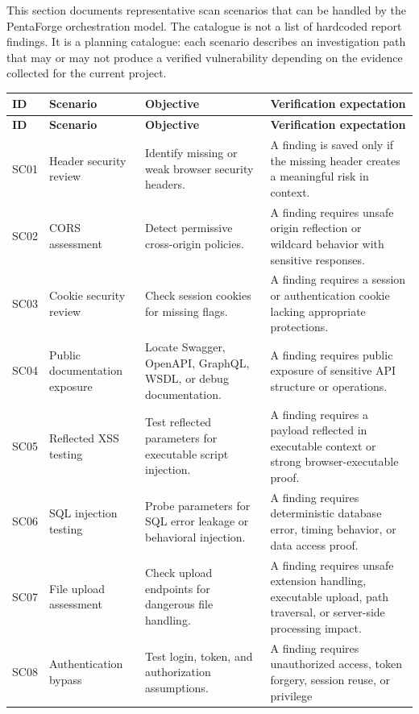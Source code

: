 \documentclass[12pt,a4paper]{report}
\begin{document}
This section documents representative scan scenarios that can be handled by the
PentaForge orchestration model. The catalogue is not a list of hardcoded report
findings. It is a planning catalogue: each scenario describes an investigation path
that may or may not produce a verified vulnerability depending on the evidence collected
for the current project.

\begin{longtable}{|p{}|p{}|p{}|p{}|}
\hline
\textbf{ID} & \textbf{Scenario} & \textbf{Objective} & \textbf{Verification expectation} \\
\hline
\endfirsthead
\hline
\textbf{ID} & \textbf{Scenario} & \textbf{Objective} & \textbf{Verification expectation} \\
\hline
\endhead
SC01 & Header security review & Identify missing or weak browser security headers. &
A finding is saved only if the missing header creates a meaningful risk in context. \\
\hline
SC02 & CORS assessment & Detect permissive cross-origin policies. & A finding requires
unsafe origin reflection or wildcard behavior with sensitive responses. \\
\hline
SC03 & Cookie security review & Check session cookies for missing flags. & A finding
requires a session or authentication cookie lacking appropriate protections. \\
\hline
SC04 & Public documentation exposure & Locate Swagger, OpenAPI, GraphQL, WSDL, or
debug documentation. & A finding requires public exposure of sensitive API structure
or operations. \\
\hline
SC05 & Reflected XSS testing & Test reflected parameters for executable script
injection. & A finding requires a payload reflected in executable context or strong
browser-executable proof. \\
\hline
SC06 & SQL injection testing & Probe parameters for SQL error leakage or behavioral
injection. & A finding requires deterministic database error, timing behavior, or data
access proof. \\
\hline
SC07 & File upload assessment & Check upload endpoints for dangerous file handling. &
A finding requires unsafe extension handling, executable upload, path traversal, or
server-side processing impact. \\
\hline
SC08 & Authentication bypass & Test login, token, and authorization assumptions. & A
finding requires unauthorized access, token forgery, session reuse, or privilege

\end{longtable}
\end{document}

